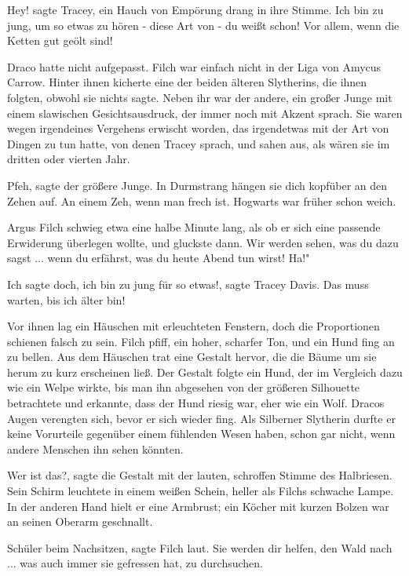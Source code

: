 \glqq Hey!\grqq{} sagte Tracey, ein Hauch von Empörung drang in ihre Stimme.
\glqq Ich bin zu jung, um so etwas zu hören - diese Art von - du weißt
schon! Vor allem, wenn die Ketten gut geölt sind!\grqq{}

Draco hatte nicht aufgepasst. Filch war einfach nicht in der Liga von Amycus
Carrow. Hinter ihnen kicherte eine der beiden älteren Slytherins, die
ihnen folgten, obwohl sie nichts sagte. Neben ihr war der andere, ein
großer Junge mit einem slawischen Gesichtsausdruck, der immer noch mit
Akzent sprach. Sie waren wegen irgendeines Vergehens erwischt worden, das
irgendetwas mit der Art von Dingen zu tun hatte, von denen Tracey sprach,
und sahen aus, als wären sie im dritten oder vierten Jahr.

\glqq Pfeh\grqq{}, sagte der größere Junge. \glqq In Durmstrang hängen sie dich
kopfüber an den Zehen auf. An einem Zeh, wenn man frech ist. Hogwarts war
früher schon weich.\grqq{}

Argus Filch schwieg etwa eine halbe Minute lang, als ob er sich eine passende
Erwiderung überlegen wollte, und gluckste dann. \glqq Wir werden sehen,
was du dazu sagst ... wenn du erfährst, was du heute Abend tun wirst!
Ha!"

\glqq Ich sagte doch, ich bin zu jung für so etwas!\grqq{}, sagte Tracey Davis.
\glqq Das muss warten, bis ich älter bin!\grqq{}

Vor ihnen lag ein Häuschen mit erleuchteten Fenstern, doch die Proportionen
schienen falsch zu sein. Filch pfiff, ein hoher, scharfer Ton, und ein
Hund fing an zu bellen. Aus dem Häuschen trat eine Gestalt hervor, die
die Bäume um sie herum zu kurz erscheinen ließ. Der Gestalt folgte ein
Hund, der im Vergleich dazu wie ein Welpe wirkte, bis man ihn abgesehen
von der größeren Silhouette betrachtete und erkannte, dass der Hund
riesig war, eher wie ein Wolf. Dracos Augen verengten sich, bevor er sich
wieder fing. Als Silberner Slytherin durfte er keine Vorurteile gegenüber
einem fühlenden Wesen haben, schon gar nicht, wenn andere Menschen ihn
sehen könnten.

\glqq Wer ist das?\grqq{}, sagte die Gestalt mit der lauten, schroffen Stimme
des Halbriesen. Sein Schirm leuchtete in einem weißen Schein, heller als
Filchs schwache Lampe. In der anderen Hand hielt er eine Armbrust; ein
Köcher mit kurzen Bolzen war an seinen Oberarm geschnallt.

\glqq Schüler beim Nachsitzen\grqq{}, sagte Filch laut. \glqq Sie werden dir
helfen, den Wald nach ... was auch immer sie gefressen hat, zu
durchsuchen.\grqq{}

